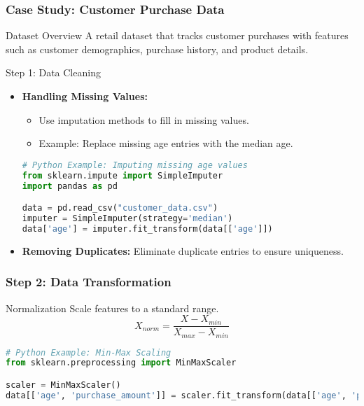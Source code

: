\documentclass[aspectratio=169]{beamer}
\begin{document}
\begin{frame}
    \frametitle{Case Study: Customer Purchase Data}
    \begin{block}{Dataset Overview}
        A retail dataset that tracks customer purchases with features such as customer demographics, purchase history, and product details.
    \end{block}

    \begin{block}{Step 1: Data Cleaning}
        \begin{itemize}
            \item \textbf{Handling Missing Values:}
            \begin{itemize}
                \item Use imputation methods to fill in missing values.
                \item Example: Replace missing age entries with the median age.
            \end{itemize}
            \begin{lstlisting}[language=Python]
# Python Example: Imputing missing age values
from sklearn.impute import SimpleImputer
import pandas as pd

data = pd.read_csv("customer_data.csv")
imputer = SimpleImputer(strategy='median')
data['age'] = imputer.fit_transform(data[['age']])
            \end{lstlisting}
            \item \textbf{Removing Duplicates:} Eliminate duplicate entries to ensure uniqueness.
        \end{itemize}
    \end{block}
\end{frame}

\begin{frame}
    \frametitle{Step 2: Data Transformation}
    \begin{block}{Normalization}
        Scale features to a standard range. 
        \begin{equation}
            X_{norm} = \frac{X - X_{min}}{X_{max} - X_{min}}
        \end{equation}
        \begin{lstlisting}[language=Python]
# Python Example: Min-Max Scaling
from sklearn.preprocessing import MinMaxScaler

scaler = MinMaxScaler()
data[['age', 'purchase_amount']] = scaler.fit_transform(data[['age', 'purchase_amount']])
        \end{lstlisting}
    \end{block}
\end{frame}
\end{document}
